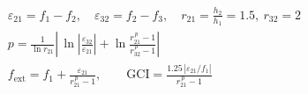 \documentclass[border=4pt,varwidth=\maxdimen]{standalone}
\begin{document}
\fontsize{14}{20}\selectfont
$\begin{aligned}
&\varepsilon_{21}=f_1-f_2,\quad \varepsilon_{32}=f_2-f_3,\quad r_{21}=\tfrac{h_2}{h_1}=1.5,\ r_{32}=2\\[3pt]
&p=\frac{1}{\ln r_{21}}\left|\,\ln\left|\frac{\varepsilon_{32}}{\varepsilon_{21}}\right|+\ln\frac{r_{21}^{\,p}-1}{r_{32}^{\,p}-1}\right|\\[3pt]
&f_{\mathrm{ext}}=f_1+\frac{\varepsilon_{21}}{r_{21}^{\,p}-1},\qquad
\mathrm{GCI}=\frac{1.25\,|\varepsilon_{21}/f_1|}{r_{21}^{\,p}-1}
\end{aligned}$
\end{document}
